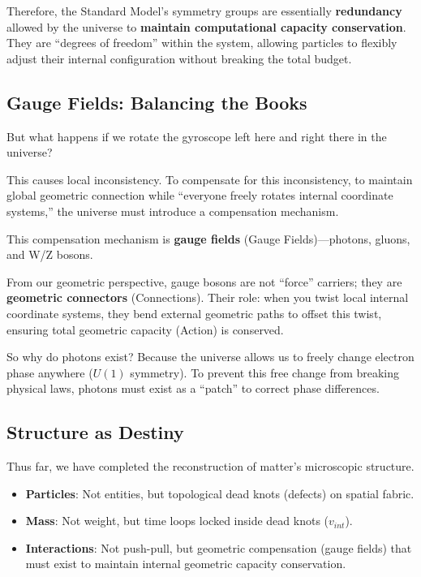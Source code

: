 \documentclass[11pt,a4paper,twoside]{book}
\begin{document}
Therefore, the Standard Model's symmetry groups are essentially \textbf{redundancy} allowed by the universe to \textbf{maintain computational capacity conservation}. They are ``degrees of freedom'' within the system, allowing particles to flexibly adjust their internal configuration without breaking the total budget.

\subsection{Gauge Fields: Balancing the Books}

But what happens if we rotate the gyroscope left here and right there in the universe?

This causes local inconsistency. To compensate for this inconsistency, to maintain global geometric connection while ``everyone freely rotates internal coordinate systems,'' the universe must introduce a compensation mechanism.

This compensation mechanism is \textbf{gauge fields} (Gauge Fields)---photons, gluons, and W/Z bosons.

From our geometric perspective, gauge bosons are not ``force'' carriers; they are \textbf{geometric connectors} (Connections). Their role: when you twist local internal coordinate systems, they bend external geometric paths to offset this twist, ensuring total geometric capacity (Action) is conserved.

So why do photons exist? Because the universe allows us to freely change electron phase anywhere ($U(1)$ symmetry). To prevent this free change from breaking physical laws, photons must exist as a ``patch'' to correct phase differences.

\subsection{Structure as Destiny}

Thus far, we have completed the reconstruction of matter's microscopic structure.

\begin{itemize}
\item \textbf{Particles}: Not entities, but topological dead knots (defects) on spatial fabric.

\item \textbf{Mass}: Not weight, but time loops locked inside dead knots ($v_{int}$).

\item \textbf{Interactions}: Not push-pull, but geometric compensation (gauge fields) that must exist to maintain internal geometric capacity conservation.
\end{itemize}
\end{document}
